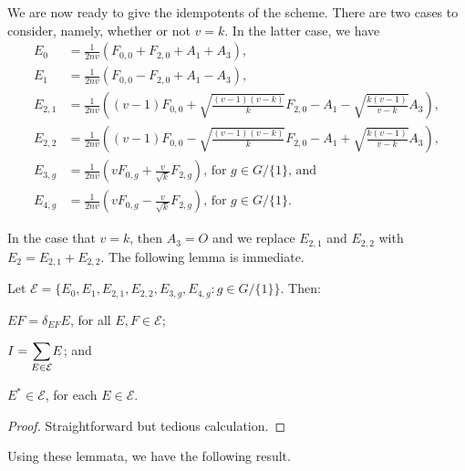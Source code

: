\documentclass[../../../main]{subfiles}
\begin{document}
We are now ready to give the idempotents of the scheme. There are two cases to
consider, namely, whether or not $v=k$. In the latter case, we have 
\begin{align*}
 E_0 &= \frac{1}{2nv}(F_{0,0} + F_{2,0} + A_1 + A_3), \\
 E_1 &= \frac{1}{2nv}\left( F_{0,0} - F_{2,0} + A_1 - A_3 \right), \\
 E_{2,1} &= \frac{1}{2nv}\left( (v-1)F_{0,0} + \sqrt{\frac{(v-1)(v-k)}{k}}F_{2,0} - A_1 - \sqrt{\frac{k(v-1)}{v-k}}A_3 \right), \\
 E_{2,2} &= \frac{1}{2nv}\left( (v-1)F_{0,0} - \sqrt{\frac{(v-1)(v-k)}{k}}F_{2,0} - A_1 + \sqrt{\frac{k(v-1)}{v-k}}A_3 \right), \\
 E_{3,g} &= \frac{1}{2nv}\left( vF_{0,g} + \frac{v}{\sqrt{k}}F_{2,g} \right) \text{, for $g \in G/\{1\}$, and} \\
 E_{4,g} &= \frac{1}{2nv}\left( vF_{0,g} - \frac{v}{\sqrt{k}}F_{2,g} \right) \text{, for $g \in G/\{1\}$.}
\end{align*}

In the case that $v=k$, then $A_3=O$ and we replace $E_{2,1}$ and $E_{2,2}$ with $E_2 = E_{2,1}+E_{2,2}$. The following lemma is immediate.

\begin{lem}
 Let $\mathcal{E} = \{E_0,E_1,E_{2,1},E_{2,2},E_{3,g},E_{4,g} : g \in G/\{1\}\}$. Then:
 \begin{defenum}
  \item $EF=\delta_{EF}E$, for all $E,F \in \mathcal{E}$;
  \item $I=\ssum_{E \in \mathcal{E}}E$; and
  \item $E^* \in \mathcal{E}$, for each $E \in \mathcal{E}$.
 \end{defenum}
\end{lem}

\begin{proof}
 Straightforward but tedious calculation.
\end{proof}

Using these lemmata, we have the following result.
\end{document}
